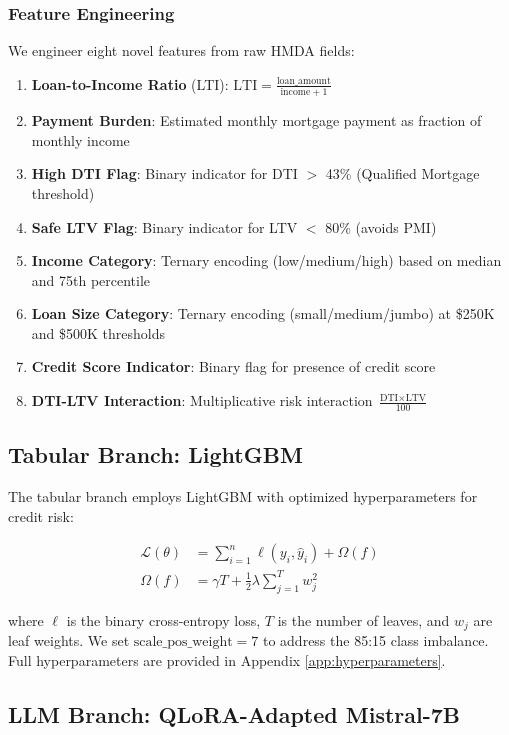 \documentclass[11pt,a4paper]{article}
\begin{document}
\subsubsection{Feature Engineering}

We engineer eight novel features from raw HMDA fields:

\begin{enumerate}
    \item \textbf{Loan-to-Income Ratio} (LTI): $\text{LTI} = \frac{\text{loan\_amount}}{\text{income} + 1}$
    \item \textbf{Payment Burden}: Estimated monthly mortgage payment as fraction of monthly income
    \item \textbf{High DTI Flag}: Binary indicator for DTI $>$ 43\% (Qualified Mortgage threshold)
    \item \textbf{Safe LTV Flag}: Binary indicator for LTV $<$ 80\% (avoids PMI)
    \item \textbf{Income Category}: Ternary encoding (low/medium/high) based on median and 75th percentile
    \item \textbf{Loan Size Category}: Ternary encoding (small/medium/jumbo) at \$250K and \$500K thresholds
    \item \textbf{Credit Score Indicator}: Binary flag for presence of credit score
    \item \textbf{DTI-LTV Interaction}: Multiplicative risk interaction $\frac{\text{DTI} \times \text{LTV}}{100}$
\end{enumerate}

\subsection{Tabular Branch: LightGBM}

The tabular branch employs LightGBM with optimized hyperparameters for credit risk:

\begin{align}
\mathcal{L}(\theta) &= \sum_{i=1}^{n} \ell(y_i, \hat{y}_i) + \Omega(f) \\
\Omega(f) &= \gamma T + \frac{1}{2}\lambda \sum_{j=1}^{T} w_j^2
\end{align}

where $\ell$ is the binary cross-entropy loss, $T$ is the number of leaves, and $w_j$ are leaf weights. We set $\text{scale\_pos\_weight} = 7$ to address the 85:15 class imbalance. Full hyperparameters are provided in Appendix \ref{app:hyperparameters}.

\subsection{LLM Branch: QLoRA-Adapted Mistral-7B}
\end{document}

